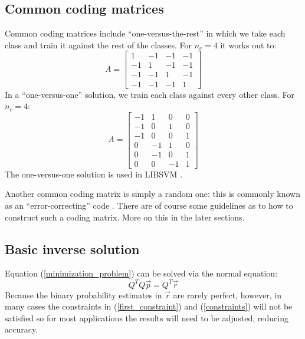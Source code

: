 \documentclass{article}
\begin{document}
\subsection{Common coding matrices}

Common coding matrices include ``one-versus-the-rest'' in which
we take each class and train it against the rest of the
classes.
For $n_c=4$ it works out to:
\begin{equation}
A = 
\begin{bmatrix}
1 & -1 & -1 & -1 \\
-1 & 1 & -1 & -1 \\
-1 & -1 & 1 & -1 \\
-1 & -1 & -1 & 1
\end{bmatrix}
\end{equation}
In a ``one-versus-one'' solution, we train each class against
every other class. For $n_c=4$:
\begin{equation}
A = 
\begin{bmatrix}
-1 & 1 & 0 & 0 \\
-1 & 0 & 1 & 0 \\
-1 & 0 & 0 & 1 \\
0 & -1 & 1 & 0 \\
0 & -1 & 0 & 1 \\
0 & 0 & -1 & 1
\end{bmatrix}
\end{equation}
The one-versus-one solution is used in LIBSVM \citep{Chang_Lin2011}.

Another common coding matrix is simply a random one: this is commonly
known as an ``error-correcting'' code \citep{Dietterich_Bakiri1995}. 
There are of course some guidelines
as to how to construct such a coding matrix. More on this in the later 
sections.

\subsection{Basic inverse solution}

Equation (\ref{minimization_problem}) can be solved via the normal
equation:
\begin{equation}
	Q^T Q \vec p = Q^T \vec r
	\label{normal_equation}
\end{equation}
Because the binary probability estimates in $\vec r$ are rarely perfect, however,
in many cases the constraints in (\ref{first_constraint}) and (\ref{constraints}) will not be satisfied 
so for most applications the results will need to be adjusted, reducing accuracy.
\end{document}
